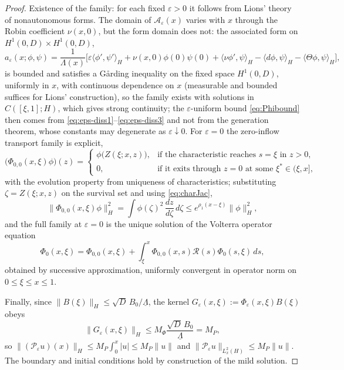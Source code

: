\documentclass[10pt,a4paper]{amsart}
\newcommand{\Hs}{H}
\newcommand{\PP}{\mathcal P}
\newcommand{\uL}{\underline\Lambda}
\begin{document}
\begin{proof}
Existence of the family: for each fixed $\varepsilon>0$ it follows from Lions' theory of nonautonomous forms. The domain of $\mathcal A_\varepsilon(x)$ varies with $x$ through the Robin coefficient $\nu(x,0)$, but the form domain does not: the associated form on $H^1(0,D)\times H^1(0,D)$,
\begin{equation}
 a_\varepsilon(x;\phi,\psi)
 =\frac{1}{\Lambda(x)}
 \Big[\varepsilon\langle\phi',\psi'\rangle_\Hs
 +\nu(x,0)\phi(0)\psi(0)
 +\langle\nu\phi',\psi\rangle_\Hs
 -\langle d\phi,\psi\rangle_\Hs
 -\langle\Theta\phi,\psi\rangle_\Hs\Big],
 \label{eq:form}
\end{equation}
is bounded and satisfies a G\aa rding inequality on the fixed space $H^1(0,D)$, uniformly in $x$, with continuous dependence on $x$ (measurable and bounded suffices for Lions' construction), so the family exists with solutions in $C([\xi,1];\Hs)$, which gives strong continuity; the $\varepsilon$-uniform bound \eqref{eq:Phibound} then comes from \eqref{eq:eps-diss1}--\eqref{eq:eps-diss3} and not from the generation theorem, whose constants may degenerate as $\varepsilon\downarrow0$. For $\varepsilon=0$ the zero-inflow transport family is explicit,
\begin{equation}
 \big(\Phi_{0,0}(x,\xi)\phi\big)(z)
 =\begin{cases}
 \phi\big(Z(\xi;x,z)\big), & \text{if the characteristic reaches }s=\xi\text{ in }z>0,\\
 0, & \text{if it exits through }z=0\text{ at some }\xi^*\in(\xi,x],
 \end{cases}
 \label{eq:Phi0def}
\end{equation}
with the evolution property from uniqueness of characteristics; substituting $\zeta=Z(\xi;x,z)$ on the survival set and using \eqref{eq:charJac},
\begin{equation}
 \|\Phi_{0,0}(x,\xi)\phi\|_\Hs^2
 =\int\phi(\zeta)^2\,\frac{dz}{d\zeta}\,d\zeta
 \le e^{\rho_1(x-\xi)}\|\phi\|_\Hs^2,
 \label{eq:Phi0bound}
\end{equation}
and the full family at $\varepsilon=0$ is the unique solution of the Volterra operator equation
\begin{equation}
 \Phi_0(x,\xi)=\Phi_{0,0}(x,\xi)+\int_\xi^x\Phi_{0,0}(x,s)\mathcal R(s)\Phi_0(s,\xi)\,ds,
 \label{eq:PhiDuhamel}
\end{equation}
obtained by successive approximation, uniformly convergent in operator norm on $0\le\xi\le x\le1$.

Finally, since $\|B(\xi)\|_\Hs\le\sqrt D\,B_0/\uL$, the kernel $G_\varepsilon(x,\xi):=\Phi_\varepsilon(x,\xi)B(\xi)$ obeys
\begin{equation}
 \|G_\varepsilon(x,\xi)\|_\Hs\le M_\Phi\frac{\sqrt D\,B_0}{\uL}=M_P,
 \label{eq:MG}
\end{equation}
so $\|(\PP_\varepsilon u)(x)\|_\Hs\le M_P\int_0^x|u|\le M_P\|u\|$ and $\|\PP_\varepsilon u\|_{L^2_x(\Hs)}\le M_P\|u\|$. The boundary and initial conditions hold by construction of the mild solution.


\end{proof}
\end{document}
